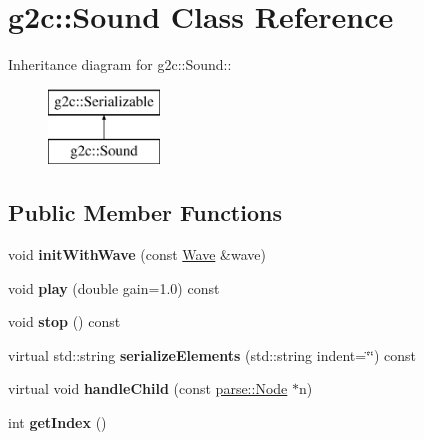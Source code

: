 \hypertarget{classg2c_1_1_sound}{
\section{g2c::Sound Class Reference}
\label{classg2c_1_1_sound}
}
Inheritance diagram for g2c::Sound::\begin{figure}[H]
\begin{center}
\leavevmode
\includegraphics[height=2cm]{classg2c_1_1_sound}
\end{center}
\end{figure}
\subsection*{Public Member Functions}
\begin{DoxyCompactItemize}
\item 
\hypertarget{classg2c_1_1_sound_a607c0efbc3faf4391a68c6b3d1b3afa7}{
void {\bfseries initWithWave} (const \hyperlink{class_wave}{Wave} \&wave)}
\label{classg2c_1_1_sound_a607c0efbc3faf4391a68c6b3d1b3afa7}

\item 
\hypertarget{classg2c_1_1_sound_a79f2c2b68df5e2ff7d89a34a198650d8}{
void {\bfseries play} (double gain=1.0) const }
\label{classg2c_1_1_sound_a79f2c2b68df5e2ff7d89a34a198650d8}

\item 
\hypertarget{classg2c_1_1_sound_a4b5bdbd88913c8966c56f7ff94995a93}{
void {\bfseries stop} () const }
\label{classg2c_1_1_sound_a4b5bdbd88913c8966c56f7ff94995a93}

\item 
\hypertarget{classg2c_1_1_sound_a607fcc5472783f4b4d21caf00798112a}{
virtual std::string {\bfseries serializeElements} (std::string indent=\char`\"{}\char`\"{}) const }
\label{classg2c_1_1_sound_a607fcc5472783f4b4d21caf00798112a}

\item 
\hypertarget{classg2c_1_1_sound_a96a97a1b430792e34bd546876374fcd9}{
virtual void {\bfseries handleChild} (const \hyperlink{classparse_1_1_node}{parse::Node} $\ast$n)}
\label{classg2c_1_1_sound_a96a97a1b430792e34bd546876374fcd9}

\item 
\hypertarget{classg2c_1_1_sound_aae80f5ff99ab08c5188f9233cc2855de}{
int {\bfseries getIndex} ()}
\label{classg2c_1_1_sound_aae80f5ff99ab08c5188f9233cc2855de}

\end{DoxyCompactItemize}
